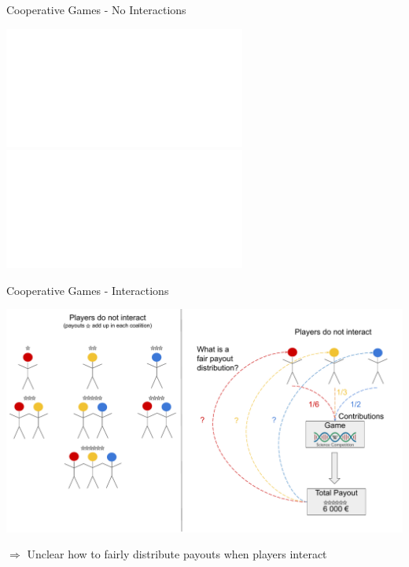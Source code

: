 \documentclass[11pt,compress,t,notes=noshow, aspectratio=169, xcolor=table]{beamer}
\begin{document}
\begin{frame}{Cooperative Games - No Interactions}
\begin{center}
\includegraphics<1>[page=1, width = \textwidth]{figure/Shapley.pdf}%
\includegraphics<2>[page=2, width = \textwidth]{figure/Shapley.pdf}%


\end{center}
\end{frame}




\begin{frame}{Cooperative Games - Interactions}
\begin{center}
\includegraphics[page=3, width = \textwidth]{figure/Shapley.pdf}

$\Rightarrow$ Unclear how to fairly distribute payouts when players interact
\end{center}
\end{frame}
\end{document}
